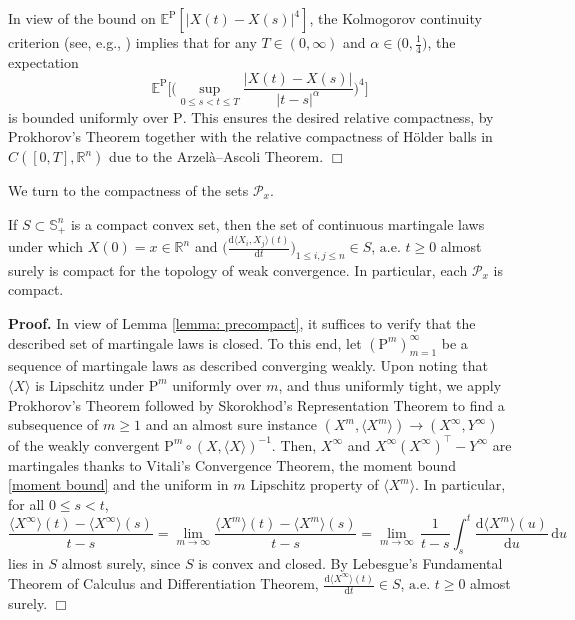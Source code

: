 \documentclass[11pt]{amsart}
\numberwithin{equation}{section}
\newcommand{\ep}{\hfill $\Box$}
\begin{document}
\medskip

In view of the bound on $\mathbb{E}^{\mathrm{P}}[|X(t) - X(s)|^4]$, the Kolmogorov continuity criterion (see, e.g., \cite[Chapter I, Theorem 2.1]{revuz_continuous_1999}) implies that for any $T\in(0,\infty)$ and $\alpha \in \big(0, \frac{1}{4}\big)$, the expectation
\[
\mathbb{E}^{\mathrm{P}} \bigg[ \bigg( \sup_{0 \leq s < t \leq T} \frac{|X(t) - X(s)|}{|t - s|^\alpha} \bigg)^4 \bigg] 
\]
is bounded uniformly over $\mathrm{P}$. This ensures the desired relative compactness, by Prokhorov's Theorem together with the relative compactness of Hölder balls in $C([0, T], \mathbb{R}^n)$ due to the Arzelà–Ascoli Theorem.  \ep

\medskip

We turn to the compactness of the sets $\mathcal{P}_x$.

\begin{lemma}\label{lemma: compact}
If $S \subset \mathbb{S}^n_+$ is a compact convex set, then the set of continuous martingale laws under which $X(0)=x\in{\mathbb R}^n$ and $\big(\frac{\mathrm{d}\langle X_i,X_j\rangle(t)}{\mathrm{d}t}\big)_{1\le i,j\le n}\in S$, $\text{a.e. }t\ge0$ almost surely is compact for the topology of weak convergence. In particular, each $\mathcal{P}_x$ is compact. 
\end{lemma}

\smallskip

\noindent\textbf{Proof.} In view of Lemma \ref{lemma: precompact}, it suffices to verify that the described set of martingale laws is closed. To this end, let $(\mathrm{P}^m)_{m=1}^\infty$ be a sequence of martingale laws as described converging weakly. Upon noting that $\langle X\rangle$ is Lipschitz under $\mathrm{P}^m$ uniformly over $m$, and thus uniformly tight, we apply Prokhorov's Theorem followed by Skorokhod's Representation Theorem to find a subsequence of $m\ge1$ and an almost sure instance $(X^m,\langle X^m\rangle)\to (X^\infty,Y^\infty)$ of the weakly convergent $\mathrm{P}^m\circ(X,\langle X\rangle)^{-1}$. Then, $X^\infty$ and $X^\infty(X^\infty)^\top-Y^\infty$ are martingales thanks to Vitali's Convergence Theorem, the moment bound \eqref{moment bound} and the uniform in $m$ Lipschitz property of $\langle X^m\rangle$. In particular, for all $0\le s<t$,
\begin{equation}
\frac{\langle X^\infty \rangle(t)-\langle X^\infty \rangle(s)}{t-s}
=\lim_{m\to\infty} \frac{\langle X^m\rangle(t)-\langle X^m\rangle(s)}{t-s}
=\lim_{m\to\infty}\,\frac{1}{t-s}\int_s^t \frac{\mathrm{d}\langle X^m\rangle(u)}{\mathrm{d}u}\,\mathrm{d}u
\end{equation}
lies in $S$  almost surely, since $S$ is convex and closed. By Lebesgue's Fundamental Theorem of Calculus and Differentiation Theorem, $\frac{\mathrm{d}\langle X^\infty \rangle(t)}{\mathrm{d}t}\in S$, $\text{a.e. }t\ge0$ almost surely. \ep
\end{document}
